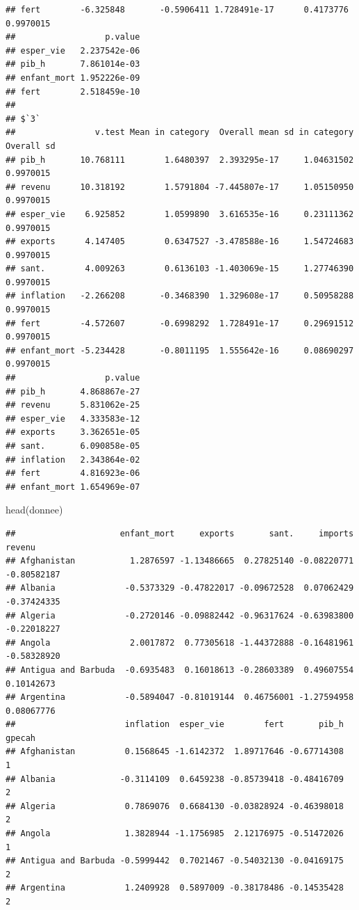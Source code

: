 \documentclass[
]{article}
\newenvironment{Shaded}{}{}
\newcommand{\FunctionTok}[1]{#1}
\newcommand{\NormalTok}[1]{#1}
\begin{document}
\begin{verbatim}
## fert        -6.325848       -0.5906411 1.728491e-17      0.4173776  0.9970015
##                  p.value
## esper_vie   2.237542e-06
## pib_h       7.861014e-03
## enfant_mort 1.952226e-09
## fert        2.518459e-10
## 
## $`3`
##                v.test Mean in category  Overall mean sd in category Overall sd
## pib_h       10.768111        1.6480397  2.393295e-17     1.04631502  0.9970015
## revenu      10.318192        1.5791804 -7.445807e-17     1.05150950  0.9970015
## esper_vie    6.925852        1.0599890  3.616535e-16     0.23111362  0.9970015
## exports      4.147405        0.6347527 -3.478588e-16     1.54724683  0.9970015
## sant.        4.009263        0.6136103 -1.403069e-15     1.27746390  0.9970015
## inflation   -2.266208       -0.3468390  1.329608e-17     0.50958288  0.9970015
## fert        -4.572607       -0.6998292  1.728491e-17     0.29691512  0.9970015
## enfant_mort -5.234428       -0.8011195  1.555642e-16     0.08690297  0.9970015
##                  p.value
## pib_h       4.868867e-27
## revenu      5.831062e-25
## esper_vie   4.333583e-12
## exports     3.362651e-05
## sant.       6.090858e-05
## inflation   2.343864e-02
## fert        4.816923e-06
## enfant_mort 1.654969e-07
\end{verbatim}

\begin{Shaded}
\begin{Highlighting}[]
\FunctionTok{head}\NormalTok{(donnee)}
\end{Highlighting}
\end{Shaded}

\begin{verbatim}
##                     enfant_mort     exports       sant.     imports      revenu
## Afghanistan           1.2876597 -1.13486665  0.27825140 -0.08220771 -0.80582187
## Albania              -0.5373329 -0.47822017 -0.09672528  0.07062429 -0.37424335
## Algeria              -0.2720146 -0.09882442 -0.96317624 -0.63983800 -0.22018227
## Angola                2.0017872  0.77305618 -1.44372888 -0.16481961 -0.58328920
## Antigua and Barbuda  -0.6935483  0.16018613 -0.28603389  0.49607554  0.10142673
## Argentina            -0.5894047 -0.81019144  0.46756001 -1.27594958  0.08067776
##                      inflation  esper_vie        fert       pib_h gpecah
## Afghanistan          0.1568645 -1.6142372  1.89717646 -0.67714308      1
## Albania             -0.3114109  0.6459238 -0.85739418 -0.48416709      2
## Algeria              0.7869076  0.6684130 -0.03828924 -0.46398018      2
## Angola               1.3828944 -1.1756985  2.12176975 -0.51472026      1
## Antigua and Barbuda -0.5999442  0.7021467 -0.54032130 -0.04169175      2
## Argentina            1.2409928  0.5897009 -0.38178486 -0.14535428      2
\end{verbatim}
\end{document}
